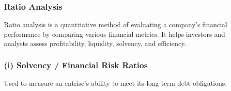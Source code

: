 \documentclass[12pt]{article}
\begin{document}
\subsubsection{Ratio Analysis}

Ratio analysis is a quantitative method of evaluating a company's financial performance by comparing various financial metrics. It helps investors and analysts assess profitability, liquidity, solvency, and efficiency.

\subsubsection*{(i) Solvency / Financial Risk Ratios}

Used to measure an entrise's ability to meet its long term debt obligations.

\renewcommand{\arraystretch}{1.5}
\end{document}
